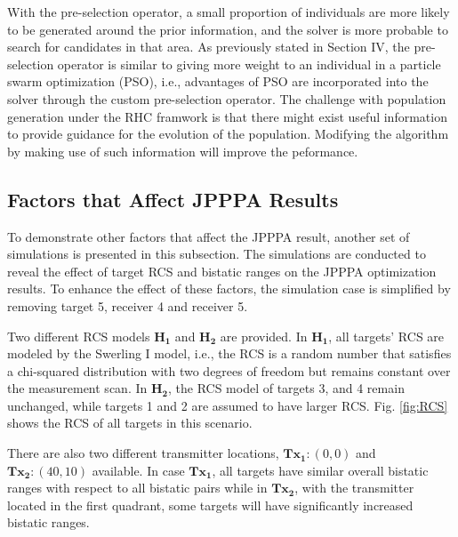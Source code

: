 \documentclass[12pt,journal,draftclsnofoot,onecolumn]{IEEEtran}
\begin{document}
With the pre-selection operator, a small proportion of individuals are more likely to be generated around the prior information, and the solver is more probable to search for candidates in that area. As previously stated in Section IV, the pre-selection operator is similar to giving more weight to an individual in a particle swarm optimization (PSO), i.e., advantages of PSO are incorporated into the solver through the custom pre-selection operator. The challenge with population generation  %
under the RHC framwork is that there might exist useful information to provide guidance for the evolution of the population. Modifying the algorithm by making use of such information will improve the peformance.

\subsection{Factors that Affect JPPPA Results}
To demonstrate other factors that affect the JPPPA result, another set of simulations is presented in this subsection. The simulations are conducted to reveal the effect of target RCS and bistatic ranges on the JPPPA optimization results. To enhance the effect of these factors, the simulation case is simplified by removing target 5, receiver 4 and receiver 5.%

Two different RCS models $\mathbf{H_1}$ and $\mathbf{H_2}$ are provided. In $\mathbf{H_1}$, all targets' RCS are modeled by the Swerling I model, i.e., the RCS is a random number that satisfies a chi-squared distribution with two degrees of freedom but remains constant over the measurement scan. In $\mathbf{H_2}$, the RCS model of targets 3, and 4 remain unchanged, while targets 1 and 2 are assumed to have larger RCS. Fig. \ref{fig:RCS} shows the RCS of all targets in this scenario.

There are also two different transmitter locations, ${\mathbf{Tx_1}}: (0,0)$ and $\mathbf{Tx_2}:(40,10)$ available. In case $\mathbf{Tx_1}$, all targets have similar overall bistatic ranges with respect to all bistatic pairs while in $\mathbf{Tx_2}$, with the transmitter located in the first quadrant, some targets will have significantly increased bistatic ranges. %
\end{document}
